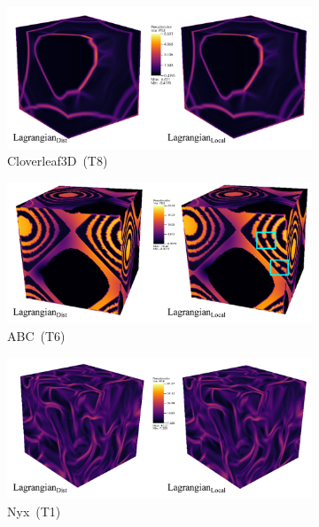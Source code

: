 \begin{figure}[!h]
\begin{subfigure}{\linewidth}
\centering
\includegraphics[width=0.85\linewidth,keepaspectratio]{Images/clover_ftle.pdf}
\vspace{-3mm}
\caption{Cloverleaf3D~(T8)}
\label{clover_ftle}
\end{subfigure}
\begin{subfigure}{\linewidth}
\centering
\includegraphics[width=0.85\linewidth,keepaspectratio]{Images/abc_ftle.pdf}
\vspace{-3mm}
\caption{ABC~(T6)}
\label{abc_ftle}
\end{subfigure}
\begin{subfigure}{\linewidth}
\centering
\includegraphics[width=0.9\linewidth,keepaspectratio]{Images/nyx_ftle.pdf}
\vspace{-3mm}
\caption{Nyx~(T1)}
\label{nyx_ftle}
\end{subfigure}
\begin{subfigure}{\linewidth}

\end{subfigure}
\end{figure}
